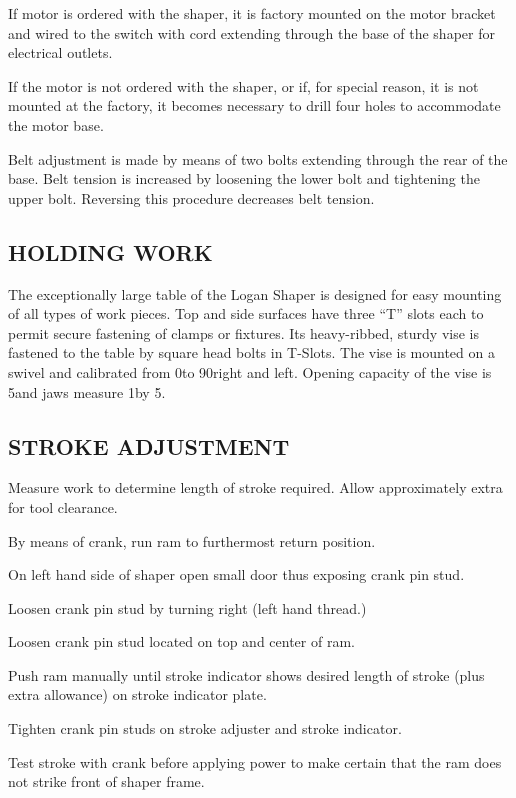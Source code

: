 \documentclass{article}
\begin{document}
If motor is ordered with the shaper, it is factory mounted on the
motor bracket and wired to the switch with cord extending through the
base of the shaper for electrical outlets.

If the motor is not ordered with the shaper, or if, for special
reason, it is not mounted at the factory, it becomes necessary to
drill four holes to accommodate the motor base.

Belt adjustment is made by means of two bolts extending through the
rear of the base.  Belt tension is increased by loosening the lower
bolt and tightening the upper bolt.  Reversing this procedure
decreases belt tension.

\subsection{HOLDING WORK}

The exceptionally large table of the Logan Shaper is designed for easy
mounting of all types of work pieces.  Top and side surfaces have
three ``T'' slots each to permit secure fastening of clamps or
fixtures.  Its heavy-ribbed, sturdy vise is fastened to the table by
square head bolts in T-Slots.  The vise is mounted on a swivel and
calibrated from 0\degrees to 90\degrees right and left.  Opening
capacity of the vise is 5\inch and jaws measure 1\half\inch by 5\inch.

\subsection{STROKE ADJUSTMENT}

Measure work to determine length of stroke required.  Allow
approximately \quarter\inch extra for tool clearance.

By means of crank, run ram to furthermost return position.

On left hand side of shaper open small door thus exposing crank pin
stud.

Loosen crank pin stud by turning right (left hand thread.)

Loosen crank pin stud located on top and center of ram.

Push ram manually until stroke indicator shows desired length of
stroke (plus \quarter\inch extra allowance) on stroke indicator plate.

Tighten crank pin studs on stroke adjuster and stroke indicator.

Test stroke with crank before applying power to make certain that the
ram does not strike front of shaper frame.
\end{document}
